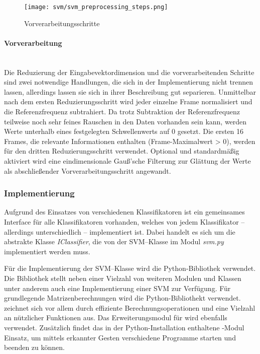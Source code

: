 \begin{figure*}[htbp] \centering
    \texttt{[image: svm/svm\_preprocessing\_steps.png]}
    \caption{Vorverarbeitungsschritte}
    \label{fig:svm_preprocessing_steps}
\end{figure*}

\paragraph{Vorverarbeitung}\label{sec:svm_preprocess}$\;$ \\\\
Die Reduzierung der Eingabevektordimension und die vorverarbeitenden Schritte sind zwei notwendige Handlungen, die sich in der Implementierung nicht trennen lassen, allerdings lassen sie sich in ihrer Beschreibung gut separieren.
Unmittelbar nach dem ersten Reduzierungsschritt wird jeder einzelne Frame normalisiert und die Referenzfrequenz subtrahiert.
Da trotz Subtraktion der Referenzfrequenz teilweise noch sehr feines Rauschen in den Daten vorhanden sein kann, werden Werte unterhalb eines festgelegten Schwellenwerts auf 0 gesetzt.
Die ersten 16 Frames, die relevante Informationen enthalten (Frame-Maximalwert > 0), werden für den dritten Reduzierungsschritt verwendet.
Optional und standardmäßig aktiviert wird eine eindimensionale Gauß'sche Filterung zur Glättung der Werte als abschließender Vorverarbeitungsschritt angewandt.

\subsubsection{Implementierung}
Aufgrund des Einsatzes von verschiedenen Klassifikatoren ist ein gemeinsames Interface für alle Klassifikatoren vorhanden, welches von jedem Klassifikator -- allerdings unterschiedlich -- implementiert ist. 
Dabei handelt es sich um die abstrakte Klasse \textit{IClassifier}, die von der \ac{SVM}--Klasse im Modul \textit{svm.py}  implementiert werden muss.

Für die Implementierung der \ac{SVM}--Klasse wird die Python-Bibliothek \cite{scikit-learn} verwendet. 
Die Bibliothek stellt neben einer Vielzahl von weiteren Modulen und Klassen unter anderem auch eine Implementierung einer \ac{SVM} zur Verfügung.
Für grundlegende Matrizenberechnungen wird die Python-Bibliothekt \cite{NumPy} verwendet. \cite{NumPy} zeichnet sich vor allem durch effiziente Berechnungsoperationen und eine Vielzahl an nützlicher Funktionen aus.
Das Erweiterungsmodul \cite{SciPy} für \cite{NumPy} wird ebenfalls verwendet.
Zusätzlich findet das in der Python-Installation enthaltene \cite{subprocess}-Modul Einsatz, um mittels erkannter Gesten verschiedene Programme starten und beenden zu können.


